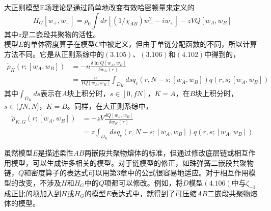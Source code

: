 大正则模型E场理论是通过简单地改变有效哈密顿量来定义的\\
\begin{equation}
H_{G}[ w_{+}, w_{-}]= \rho_{0} \int dr [(1/\chi_{AB}) w_{-}^{2}-i w_{+}]- z  V Q[w_{A},w_{B}]
\end{equation}
其中$z$是二嵌段共聚物的活性。\\

模型$E$的单体密度算子在模型$C$中被定义，但由于单链分配函数的不同，所以计算方法不同。它是从正则系综中的$(3.105)$、$(3.106)$和$(4.102)$中得到的，\\
\begin{equation}
\begin{aligned}
\tilde{\rho}_{K}(r;[w_{A},w_{B}]) &=-n \frac{\delta \ln Q[w_{A},w_{B}]}{\delta w_{K}(r)} \\&= \frac{n}{V Q[w_{A},w_{B}]} \int_{D_{K}} ds q_{c}(r,N-s;[w_{A},w_{B}])q(r,s;[w_{A},w_{B}])
\end{aligned}
\end{equation}
其中$\int_{D_{K}} ds$表示在$A$块上积分时，$s\in[0,fN]$，$K=A$，在$B$块上积分时，$s\in(fN,N]$，$K=B$。同样，在大正则系综中，\\
\begin{equation}
\begin{aligned}
\tilde{\rho}_{K,G}(r;[w_{A},w_{B}])&=-z V \frac{\delta Q[w_{A},w_{B}]}{\delta w_{K}(r)} \\&= z \int_{D_{K}} d s q_{c}(r,N-s;[w_{A},w_{B}])q(r,s;[w_{A},w_{B}])
\end{aligned}
\end{equation}

虽然模型$E$是描述柔性$AB$两嵌段共聚物熔体的标准，但通过修改底层链或相互作用模型，可以生成许多相关的模型。对于链模型的修正，如珠弹簧二嵌段共聚物链，$Q$和密度算子的表达式可以用第3章中的公式很容易地适应。对于相互作用模型的改变，不涉及$H$和$H_{G}$中的$Q$项都可以修改。例如，将$D$模型$(4.106)$中与$\zeta_{-1}$成正比的项加入到$H$或$H_{G}$的模型$E$表达式中，就得到了可压缩$AB$二嵌段共聚物熔体的模型。

